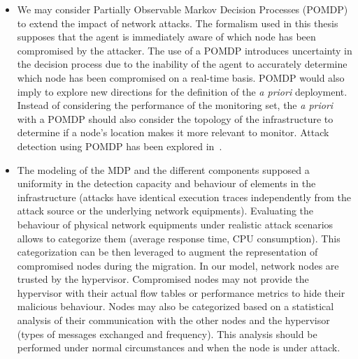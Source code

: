 \begin{itemize}
    \item 
    We may consider Partially Observable Markov Decision Processes (POMDP) to extend the impact of network attacks.
    The formalism used in this thesis supposes that the agent is immediately aware of which node has been compromised by the attacker. The use of a POMDP introduces uncertainty in the decision process due to the inability of the agent to accurately determine which node has been compromised on a real-time basis. POMDP would also imply to explore new directions for the definition of the \textit{a priori} deployment. Instead of considering the performance of the monitoring set, the \textit{a priori} with a POMDP should also consider the topology of the infrastructure to determine if a node's location makes it more relevant to monitor. Attack detection using POMDP has been explored in~\cite{RL-POMDP}.
    
    \item 
    The modeling of the MDP and the different components supposed a uniformity in the detection capacity and behaviour of elements in the infrastructure (\eg attacks have identical execution traces independently from the attack source or the underlying network equipments). Evaluating the behaviour of physical network equipments under realistic attack scenarios allows to categorize them (\eg average response time, CPU consumption). This categorization can be then leveraged to augment the representation of compromised nodes during the migration. In our model, network nodes are trusted by the hypervisor. Compromised nodes may not provide the hypervisor with their actual flow tables or performance metrics to hide their malicious behaviour. Nodes may also be categorized based on a statistical analysis of their communication with the other nodes and the hypervisor (\eg types of messages exchanged and frequency). This analysis should be performed under normal circumstances and when the node is under attack.
    
\end{itemize}




